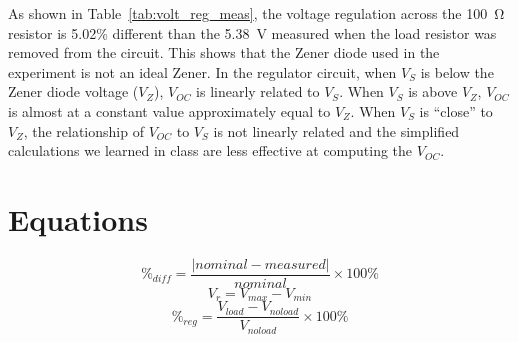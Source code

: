 \documentclass{article}
\begin{document}
As shown in Table~\ref{tab:volt_reg_meas}, the voltage regulation across the \SI{100}{\ohm} resistor is 5.02\% different than the \SI{5.38}{V} measured when the load resistor was removed from the circuit.  This shows that the Zener diode used in the experiment is not an ideal Zener.  In the regulator circuit, when $V_S$ is below the Zener diode voltage ($V_Z$), $V_{OC}$ is linearly related to $V_S$.  When $V_S$ is above $V_Z$, $V_{OC}$ is almost at a constant value approximately equal to $V_Z$.  When $V_S$ is “close” to $V_Z$, the relationship of $V_{OC}$ to $V_S$ is not linearly related and the simplified calculations we learned in class are less effective at computing the $V_{OC}$.

%





\section{Equations}
\label{sec:equations}

%
\begin{equation}
  \label{eq:percent_diff}
  \%_{diff} = \frac{|nominal - measured|}{nominal}\times 100\%
\end{equation}
%
\begin{equation}
  \label{eq:ripple}
  V_r = V_{max} - V_{min}
\end{equation}
%
\begin{equation}
  \label{eq:volt_reg}
  \%_{reg} = \frac{V_{load} - V_{no load}}{V_{no load}}\times 100\%
\end{equation}
\end{document}
